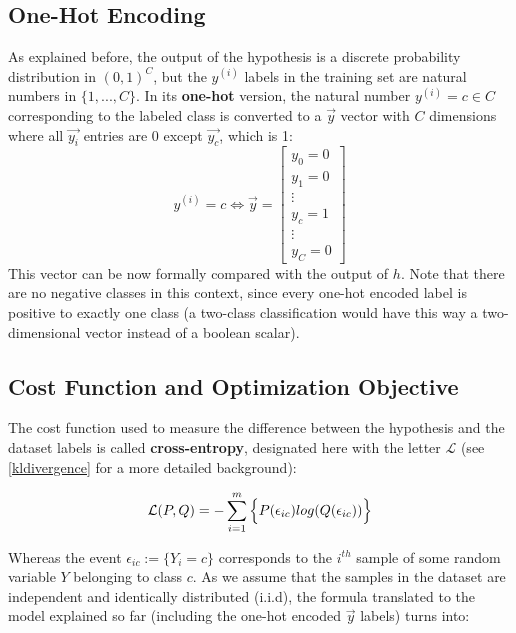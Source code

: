 \subsection{One-Hot Encoding}

As explained before, the output of the hypothesis is a discrete probability distribution in \((0,1)^C\), but the \(y^{(i)}\) labels in the training set are natural numbers in \(\{1, ..., C\}\). In its \textbf{one-hot} version, the natural number \(y^{(i)} = c\in C\) corresponding to the labeled class is converted to a \(\vec{y}\) vector with \(C\) dimensions where all \(\vec{y_i}\) entries are 0 except \(\vec{y_c}\), which is 1:
\begin{equation*}
  y^{(i)}= c  \iff \vec{y}= \begin{bmatrix}y_0 = 0 \\ y_1 = 0 \\ \vdots \\ y_c = 1 \\ \vdots \\ y_C = 0\end{bmatrix}
\end{equation*}
This vector can be now formally compared with the output of \(h\). Note that there are no negative classes in this context, since every one-hot encoded label is positive to exactly one class (a two-class classification would have this way a two-dimensional vector instead of a boolean scalar).



\subsection{Cost Function and Optimization Objective}\label{logregcost}

The cost function used to measure the difference between the hypothesis and the dataset labels is called \textbf{cross-entropy}, designated here with the letter \(\mathcal{L}\) (see \ref{kldivergence} for a more detailed background):

\begin{equation*}
  \mathcal{L}(P, Q) = -\sum_{i=1}^{m} \Big\{P(\epsilon_{ic}) log(Q(\epsilon_{ic})) \Big\}\\[3mm]
\end{equation*}

Whereas the event \(\epsilon_{ic} := \{Y_i=c\}\) corresponds to the \(i^{th}\) sample of some random variable \(Y\) belonging to class \(c\). As we assume that the samples in the dataset are independent and identically distributed (i.i.d), the formula translated to the model explained so far (including the one-hot encoded \(\vec{y}\) labels) turns into:

